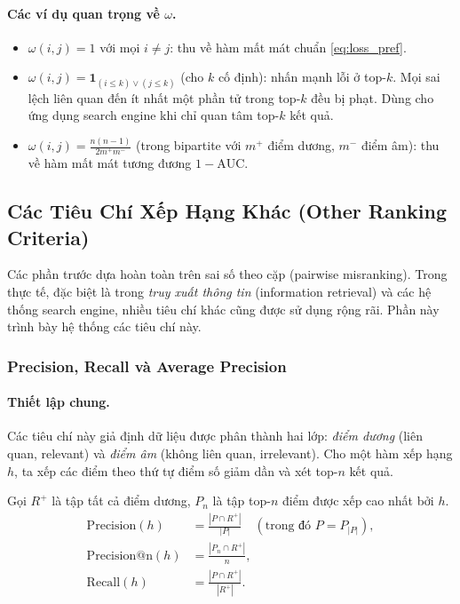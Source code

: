 \paragraph{Các ví dụ quan trọng về $\omega$.}
\begin{itemize}
    \item $\omega(i,j) = 1$ với mọi $i \neq j$: thu về hàm mất mát chuẩn \eqref{eq:loss_pref}.
    \item $\omega(i,j) = \mathbf{1}_{(i \leq k) \vee (j \leq k)}$ (cho $k$ cố định): nhấn mạnh lỗi ở top-$k$. Mọi sai lệch liên quan đến ít nhất một phần tử trong top-$k$ đều bị phạt. Dùng cho ứng dụng search engine khi chỉ quan tâm top-$k$ kết quả.
    \item $\omega(i,j) = \frac{n(n-1)}{2m^+m^-}$ (trong bipartite với $m^+$ điểm dương, $m^-$ điểm âm): thu về hàm mất mát tương đương $1 - \mathrm{AUC}$.
\end{itemize}

\subsection{Các Tiêu Chí Xếp Hạng Khác (Other Ranking Criteria)}
\label{sec:other_ranking}

Các phần trước dựa hoàn toàn trên sai số theo cặp (pairwise misranking). Trong thực tế, đặc biệt là trong \emph{truy xuất thông tin} (information retrieval) và các hệ thống search engine, nhiều tiêu chí khác cũng được sử dụng rộng rãi. Phần này trình bày hệ thống các tiêu chí này.

\subsubsection{Precision, Recall và Average Precision}

\paragraph{Thiết lập chung.}
Các tiêu chí này giả định dữ liệu được phân thành hai lớp: \emph{điểm dương} (liên quan, relevant) và \emph{điểm âm} (không liên quan, irrelevant). Cho một hàm xếp hạng $h$, ta xếp các điểm theo thứ tự điểm số giảm dần và xét top-$n$ kết quả.

\begin{definition}
Gọi $R^+$ là tập tất cả điểm dương, $P_n$ là tập top-$n$ điểm được xếp cao nhất bởi $h$.
\begin{align}
    \mathrm{Precision}(h) &= \frac{|P \cap R^+|}{|P|} \quad (\text{trong đó } P = P_{|P|}), \label{eq:precision}\\
    \mathrm{Precision@n}(h) &= \frac{|P_n \cap R^+|}{n}, \label{eq:precision_at_n}\\
    \mathrm{Recall}(h) &= \frac{|P \cap R^+|}{|R^+|}. \label{eq:recall}
\end{align}
\end{definition}

